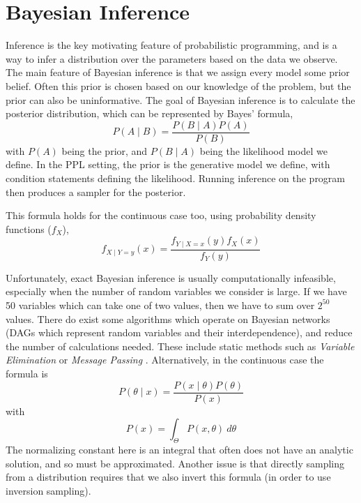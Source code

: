\section{Bayesian Inference}
Inference is the key motivating feature of probabilistic programming, and is a way to infer a distribution over the parameters based on the data we observe. The main feature of Bayesian inference is that we assign every model some prior belief. Often this prior is chosen based on our knowledge of the problem, but the prior can also be uninformative. The goal of Bayesian inference is to calculate the posterior distribution, which can be represented by Bayes' formula,
\[P(A\mid B)={\frac {P(B\mid A)P(A)}{P(B)}}\]
with $P(A)$ being the prior, and $P(B\mid A)$ being the likelihood model we define. In the PPL setting, the prior is the generative model we define, with condition statements defining the likelihood. Running inference on the program then produces a sampler for the posterior.

This formula holds for the continuous case too, using probability density functions ($f_X$),
% 
\[ f_{X\mid Y=y}(x)={\frac {f_{Y\mid X=x}(y)f_{X}(x)}{f_{Y}(y)}} \]
% 


Unfortunately, exact Bayesian inference is usually computationally infeasible, especially when the number of random variables we consider is large. If we have 50 variables which can take one of two values, then we have to sum over $2^{50}$ values. There do exist some algorithms which operate on Bayesian networks (DAGs which represent random variables and their interdependence), and reduce the number of calculations needed. These include static methods such as \textit{Variable Elimination} or \textit{Message Passing} \cite{belief-prop}.
% 
Alternatively, in the continuous case the formula is
% 
\[P(\theta\mid x)=\frac{P(x\mid\theta)P(\theta)}{P(x)}\]
with 
\[P(x)=\int_{\Theta}P(x,\theta)~d\theta\]
% 
The normalizing constant here is an integral that often does not have an analytic solution, and so must be approximated. Another issue is that directly sampling from a distribution requires that we also invert this formula (in order to use inversion sampling).
% 
